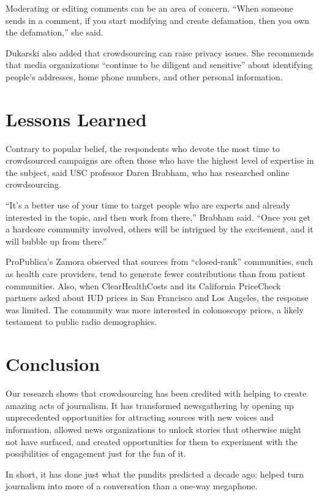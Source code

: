 \documentclass[notoc, symmetric, nobib, nols]{towcenter-guideto-book}
\begin{document}
Moderating or editing comments can be an area of concern. ``When someone sends in a comment, if you start modifying and create defamation, then you own the defamation,'' she said.

Dukarski also added that crowdsourcing can raise privacy issues. She recommends that media organizations ``continue to be diligent and sensitive'' about identifying people's addresses, home phone numbers, and other personal information. 


\chapter{Lessons Learned} 

Contrary to popular belief, the respondents who devote the most time to crowdsourced campaigns are often those who have the highest level of expertise in the subject, said USC professor Daren Brabham, who has researched online crowdsourcing. 

``It's a better use of your time to target people who are experts and already interested in the topic, and then work from there,'' Brabham said. ``Once you get a hardcore community involved, others will be intrigued by the excitement, and it will bubble up from there.''\autocite{BrabhamAmateur}

ProPublica's Zamora observed that sources from ``closed-rank'' communities, such as health care providers, tend to generate fewer contributions than from patient communities. Also, when ClearHealthCosts and its California PriceCheck partners asked about IUD prices in San Francisco and Los Angeles, the response was limited. The community was more interested in colonoscopy prices, a likely testament to public radio demographics.%

\chapter{Conclusion} 

Our research shows that crowdsourcing has been credited with helping to create amazing acts of journalism. It has transformed newsgathering by opening up unprecedented opportunities for attracting sources with new voices and information, allowed news organizations to unlock stories that otherwise might not have surfaced, and created opportunities for them to experiment with the possibilities of engagement just for the fun of it.

In short, it has done just what the pundits predicted a decade ago: helped turn journalism into more of a conversation than a one-way megaphone. 
\end{document}
